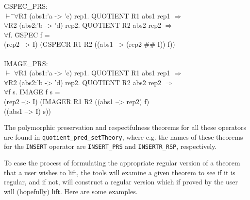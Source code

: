 \documentclass[envcountsame,runningheads]{llncs}
\begin{document}
{\tt \begin{tabbing}
GSPEC\_PRS: \\
\hspace{1.5mm}
    $\vdash$ \=$\forall$R\=1 (abs1:'a -> 'c) rep1. QUOTIENT R1 abs1 rep1 $\Rightarrow$ \\
\>           $\forall$R2 (abs2:'b -> 'd) rep2. QUOTIENT R2 abs2 rep2 $\Rightarrow$ \\
\>\>     $\forall$f. \=GSPEC f = \\
\>\>\>     (rep2 --> I) (GSPECR R1 R2 ((abs1 --> (rep2 \#\# I)) f)) \\
\\
IMAGE\_PRS: \\
\hspace{1.5mm}
    $\vdash$ $\forall$R1 (abs1:'a -> 'c) rep1. QUOTIENT R1 abs1 rep1 $\Rightarrow$ \\
\>           $\forall$R2 (abs2:'b -> 'd) rep2. QUOTIENT R2 abs2 rep2 $\Rightarrow$ \\
\>\>     $\forall$f s. IMAGE f s = \\
\>\>\>     (rep2 --> I) (IMAGER R1 R2 \=((abs1 --> rep2) f) \\
\>\>\>\>                                ((abs1 --> I) s))
\end{tabbing}}

The polymorphic preservation and respectfulness theorems for all these
operators are found in {\tt quotient\_pred\_setTheory}, where e.g. the
names of these theorems for the {\tt INSERT} operator are
{\tt INSERT\_PRS} and {\tt INSERTR\_RSP}, respectively.

To ease the process of formulating the appropriate regular version of a
theorem that a user wishes to lift, the tools will examine a given
theorem to see if it is regular, and if not, will construct a regular
version which if proved by the user will (hopefully) lift.
Here are some examples.
\end{document}
